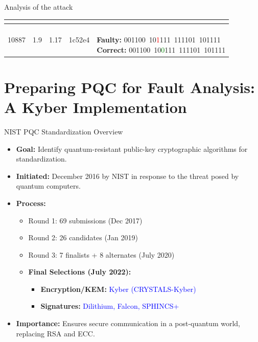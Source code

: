 \documentclass{beamer}
\newenvironment{tres important}[2][]{
	\setkeys{EmphEqEnv}{#2}
	\setkeys{EmphEqOpt}{box={\setlength{\fboxsep}{10pt}\fcolorbox{myNewColorA}{white}},#1}
	\EmphEqMainEnv}
{\endEmphEqMainEnv}
\begin{document}
\begin{frame}{Analysis of the attack}
\begin{table}[h!]
\begin{tabular}{|c|c|c|c|p{5.5cm}|}
{    } \\
    \hline
    10887 & 1.9 & 1.17 & 1c52e4 & 
    \parbox{5.5cm}{
        \text{}\\
        \textbf{Faulty:} 001100\ 10\textcolor{red}{1}111\ 111101\ 101111 \\
        \textbf{Correct:} 001100\ 10\textcolor{green}{0}111\ 111101\ 101111 \\

    } \\
    \hline
    \end{tabular}
    \label{tab:glitch_summary}
    \end{table}

\end{frame}
\section{Preparing PQC for Fault Analysis: A Kyber Implementation}
\begin{frame}{NIST PQC Standardization Overview}
  \small
  \begin{itemize}
    \item \textbf{Goal:} Identify quantum-resistant public-key cryptographic algorithms for standardization.
    
    \item \textbf{Initiated:} December 2016 by NIST in response to the threat posed by quantum computers.

    \item \textbf{Process:}
    \begin{itemize}
      \item Round 1: 69 submissions (Dec 2017)
      \item Round 2: 26 candidates (Jan 2019)
      \item Round 3: 7 finalists + 8 alternates (July 2020)
      \item \textbf{Final Selections (July 2022):}
      \begin{itemize}
        \item \textbf{Encryption/KEM:} \textcolor{blue}{Kyber (CRYSTALS-Kyber)}
        \item \textbf{Signatures:} \textcolor{blue}{Dilithium, Falcon, SPHINCS+}
      \end{itemize}
    \end{itemize}

    \item \textbf{Importance:} Ensures secure communication in a post-quantum world, replacing RSA and ECC.
  \end{itemize}
\end{frame}
\end{document}
